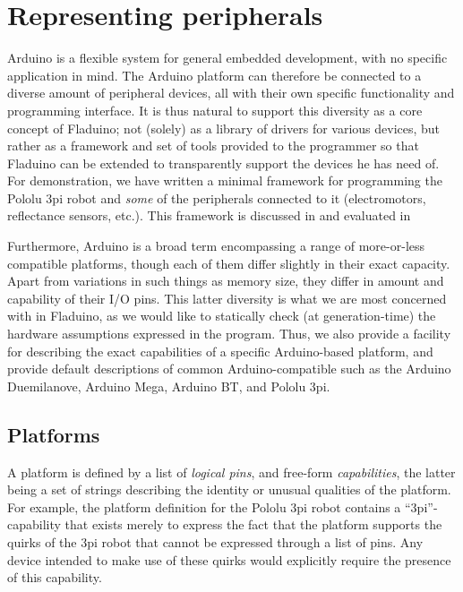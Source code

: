 \documentclass[a4paper, oneside, final]{memoir}
\let\Fref\undefined
\begin{document}
\section{Representing peripherals} Arduino is a flexible system for
general embedded development, with no specific application in mind.
The Arduino platform can therefore be connected to a diverse amount of
peripheral devices, all with their own specific functionality and
programming interface.  It is thus natural to support this diversity
as a core concept of Fladuino; not (solely) as a library of drivers
for various devices, but rather as a framework and set of tools
provided to the programmer so that Fladuino can be extended to
transparently support the devices he has need of.  For demonstration,
we have written a minimal framework for programming the Pololu 3pi
robot and \textit{some} of the peripherals connected to it
(electromotors, reflectance sensors, etc.). This framework is
discussed in \Fref[plain]{chap:example code} and evaluated in
\Fref[plain]{chap:evaluation}

Furthermore, Arduino is a broad term encompassing a range of
more-or-less compatible platforms, though each of them differ slightly
in their exact capacity.  Apart from variations in such things as
memory size, they differ in amount and capability of their I/O pins.
This latter diversity is what we are most concerned with in Fladuino,
as we would like to statically check (at generation-time) the
hardware assumptions expressed in the program.  Thus, we also provide
a facility for describing the exact capabilities of a specific
Arduino-based platform, and provide default descriptions of common
Arduino-compatible such as the Arduino Duemilanove, Arduino Mega,
Arduino BT, and Pololu 3pi.



\subsection{Platforms}
\label{sec:platforms}
A platform is defined by a list of \textit{logical pins}, and
free-form \textit{capabilities}, the latter being a set of strings
describing the identity or unusual qualities of the platform.  For
example, the platform definition for the Pololu 3pi robot contains a
``3pi''-capability that exists merely to express the fact that the
platform supports the quirks of the 3pi robot that cannot be expressed
through a list of pins.  Any device intended to make use of these
quirks would explicitly require the presence of this capability.
\end{document}

